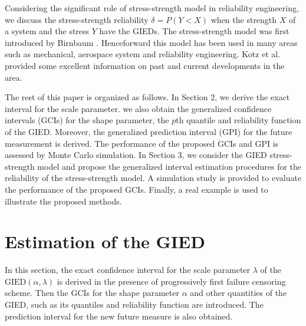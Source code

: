 \documentclass[12pt]{article}
\begin{document}
Considering the significant role of stress-strength model in reliability engineering, we discuss the stress-strength reliability $\delta=P(Y<X)$ when the strength $X$ of a system and the stress $Y$ have the GIEDs. The stress-strength model was first introduced by Birnbaum \cite{birnbaum1956use}. Henceforward this model has been used in many areas such as mechanical, aerospace system and reliability engineering. Kotz et al. \cite{kotz2003stress} provided some excellent information on past and current developments in the area.


The rest of this paper is organized as follows. In Section 2, we derive the exact interval for the scale parameter. we also obtain the generalized confidence intervals (GCIs) for the shape parameter, the $p$th quantile and reliability function of the GIED. Moreover, the generalized prediction interval (GPI) for the future measurement is derived. The performance of the proposed GCIs and GPI is assessed by Monte Carlo simulation. In Section 3, we consider the GIED stress-strength model and propose the generalized interval estimation procedures for the reliability of the stress-strength model. A simulation study is provided to evaluate the performance of the proposed GCIs. Finally, a real example is used to illustrate the proposed methods.

\section{Estimation of the GIED}

In this section, %
the exact confidence interval for the scale parameter $\lambda$ of the $\mbox{GIED}(\alpha,\lambda)$ is derived in the presence of progressively first failure censoring scheme. Then the GCIs for the shape parameter $\alpha$ and other quantities of the GIED, such as its quantiles and reliability function are introduced. The prediction interval for the new future measure is also obtained.
\end{document}
